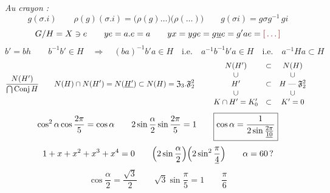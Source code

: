 \documentclass[11pt,a4paper]{article}
\begin{document}
\emph{Au crayon :}
\[
  g(\sigma . i) \qquad \rho(g)(\sigma . i) = \bigl(\rho(g)\ldots\bigr)\bigl(\rho(\ldots)\bigr) \qquad g(\sigma i) = g\sigma g^{-1}\, gi
\]
\[
  G/H = X \ni e \qquad y e = a . e = a \qquad y x = y g e = g \uncertain{u} e = g' a e = \ill{}
\]
\[
  b' = b h \qquad b^{-1} b' \in H \quad \Longrightarrow \quad (ba)^{-1} b' a \in H \quad \text{i.e.} \quad a^{-1} b^{-1} b' a \in H \quad \text{i.e.} \quad a^{-1} H a \subset H
\]
\[
  \frac{N(H')}{\bigcap \operatorname{Conj} H} \qquad
  N(H) \cap N(H') = N(\uncertain{H'}) \subset N(H) = \mathfrak{Z}_3 . \mathfrak{F}_2^{2}
  \qquad
  \begin{array}{ccc}
    N(H') & \subset & N(H) \\
    \cup & & \cup \\
    H' & \subset & H \;\text{---}\; \mathfrak{F}_2^{2} \\
    \cup & & \cup \\
    K \cap H' = K'_0 & \subset & K' = 0
  \end{array}
\]
\[
  \cos^{2}\alpha \cos\frac{2\pi}{5} = \cos\alpha \qquad 2\sin\frac{\alpha}{2}\sin\frac{2\pi}{5} = 1 \qquad \boxed{\cos\alpha = \frac{1}{2\sin\frac{2\pi}{\uncertain{10}}}}
\]
\[
  1 + x + x^{2} + x^{3} + x^{4} = 0 \qquad \Bigl(2\sin\frac{\alpha}{2}\Bigr)\Bigl(2\sin^{2}\frac{\pi}{\uncertain{4}}\Bigr) \qquad \alpha = 60\,?
\]
\[
   \cos\frac{\alpha}{2} = \frac{\sqrt{3}}{2} \qquad \sqrt{3}\sin\frac{\pi}{5} = 1 \qquad \frac{\pi}{6}
\]
\end{document}
